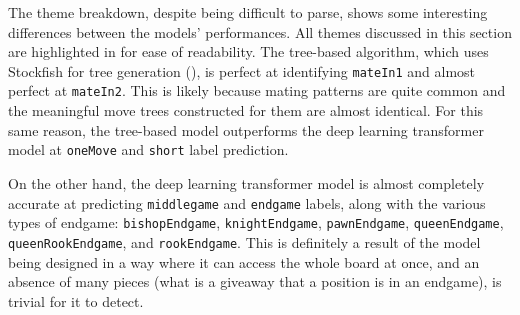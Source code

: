 The theme breakdown, despite being difficult to parse, shows some interesting
differences between the models' performances. All themes discussed in this
section are highlighted in  for ease of readability. The
tree-based algorithm, which uses Stockfish for tree generation
(), is perfect at identifying \texttt{mateIn1} and almost perfect
at \texttt{mateIn2}. This is likely because mating patterns are quite common
and the meaningful move trees constructed for them are almost identical. For
this same reason, the tree-based model outperforms the deep learning
transformer model at \texttt{oneMove} and \texttt{short} label prediction.

On the other hand, the deep learning transformer model is almost completely
accurate at predicting \texttt{middlegame} and \texttt{endgame} labels, along
with the various types of endgame: \texttt{bishopEndgame},
\texttt{knightEndgame}, \texttt{pawnEndgame}, \texttt{queenEndgame},
\texttt{queenRookEndgame}, and \texttt{rookEndgame}. This is definitely a
result of the model being designed in a way where it can access the whole board
at once, and an absence of many pieces (what is a giveaway that a position is
in an endgame), is trivial for it to detect.


